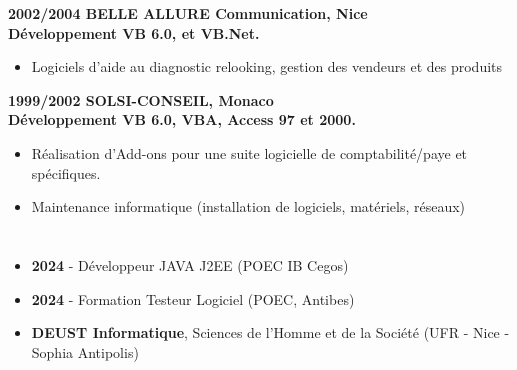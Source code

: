 \documentclass[10pt,a4paper]{article}
\newcommand{\myvspace}{\vspace{0.3cm}}
\begin{document}
\begin{minipage}[t]{0.65\textwidth}
    \myvspace
    \textbf{2002/2004 BELLE ALLURE Communication, Nice \\
    Développement VB 6.0, et VB.Net. }
        \begin{itemize}[nosep, leftmargin=*, itemsep=0pt, parsep=0pt]
            \item Logiciels d’aide au diagnostic relooking, gestion des vendeurs et des produits 
        \end{itemize}
    \myvspace 
    \textbf{1999/2002 SOLSI-CONSEIL, Monaco \\
    Développement VB 6.0, VBA, Access 97 et 2000. }
        \begin{itemize}[nosep, leftmargin=*, itemsep=0pt, parsep=0pt]
            \item Réalisation d’Add-ons pour une suite logicielle de comptabilité/paye et spécifiques.
            \item Maintenance informatique (installation de logiciels, matériels, réseaux)
        \end{itemize}
    \myvspace
    \section*{}
    \begin{itemize}[nosep, leftmargin=*, itemsep=0pt, parsep=0pt]
        \item \textbf{2024} - Développeur JAVA J2EE (POEC IB Cegos)
        \item \textbf{2024} - Formation Testeur Logiciel (POEC, Antibes) 
        \item \textbf{DEUST Informatique}, Sciences de l’Homme et de la Société (UFR - Nice - Sophia Antipolis)
    \end{itemize}

\end{minipage}
\end{document}
